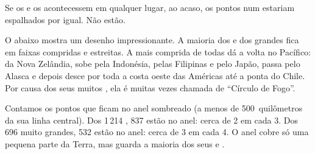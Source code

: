 Se os  e os  acontecessem em qualquer lugar, ao acaso, os
pontos num  estariam espalhados por igual. Não estão.

O  abaixo mostra um desenho impressionante. A maioria dos  e dos
grandes  fica em faixas compridas e estreitas. A mais comprida
de todas dá a volta no  Pacífico: da Nova Zelândia, sobe pela
Indonésia, pelas Filipinas e pelo Japão, passa pelo Alasca e depois desce
por toda a costa oeste das Américas até a ponta do Chile. Por causa dos
seus muitos , ela é muitas vezes chamada de ``Círculo de Fogo''.

\begin{example}\label{ex:g4:volcanoes-earthquakes-first-look:shares}
Contamos os pontos que ficam no anel sombreado (a menos de
500~quilômetros da sua linha central). Dos 1\,214 , 837 estão no
anel: cerca de 2 em cada 3. Dos 696  muito grandes, 532 estão no
anel: cerca de 3 em cada 4. O anel cobre só uma pequena parte da Terra,
mas guarda a maioria dos seus  e .
\end{example}

